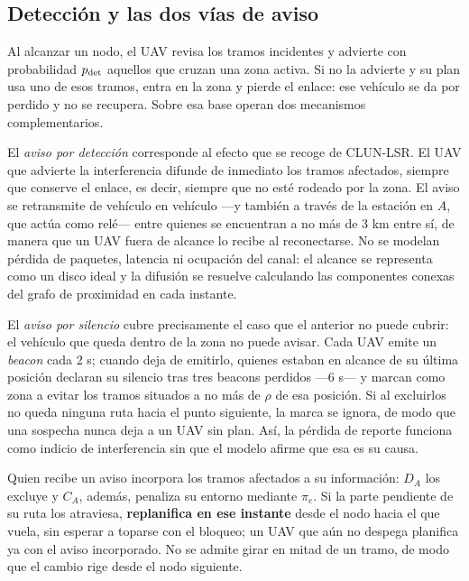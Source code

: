 \documentclass[journal,10pt]{IEEEtran}
\begin{document}
\subsection{Detección y las dos vías de aviso}

Al alcanzar un nodo, el UAV revisa los tramos incidentes y advierte con
probabilidad $p_{\rm det}$ aquellos que cruzan una zona activa. Si no la
advierte y su plan usa uno de esos tramos, entra en la zona y pierde el
enlace: ese vehículo se da por perdido y no se recupera. Sobre esa base
operan dos mecanismos complementarios.

El \emph{aviso por detección} corresponde al efecto que se recoge de
CLUN-LSR. El UAV que advierte la interferencia difunde de inmediato los
tramos afectados, siempre que conserve el enlace, es decir, siempre que no
esté rodeado por la zona. El aviso se retransmite de vehículo en vehículo
---y también a través de la estación en $A$, que actúa como relé--- entre
quienes se encuentran a no más de 3 km entre sí, de manera que un UAV fuera
de alcance lo recibe al reconectarse. No se modelan pérdida de paquetes,
latencia ni ocupación del canal: el alcance se representa como un disco
ideal y la difusión se resuelve calculando las componentes conexas del
grafo de proximidad en cada instante.

El \emph{aviso por silencio} cubre precisamente el caso que el anterior no
puede cubrir: el vehículo que queda dentro de la zona no puede avisar. Cada
UAV emite un \emph{beacon} cada 2 s; cuando deja de emitirlo, quienes
estaban en alcance de su última posición declaran su silencio tras tres
beacons perdidos ---6 s--- y marcan como zona a evitar los tramos situados
a no más de $\rho$ de esa posición. Si al excluirlos no queda ninguna ruta
hacia el punto siguiente, la marca se ignora, de modo que una sospecha
nunca deja a un UAV sin plan. Así, la pérdida de reporte funciona como
indicio de interferencia sin que el modelo afirme que esa es su causa.

Quien recibe un aviso incorpora los tramos afectados a su información:
$D_A$ los excluye y $C_A$, además, penaliza su entorno mediante $\pi_e$. Si
la parte pendiente de su ruta los atraviesa, \textbf{replanifica en ese
instante} desde el nodo hacia el que vuela, sin esperar a toparse con el
bloqueo; un UAV que aún no despega planifica ya con el aviso incorporado.
No se admite girar en mitad de un tramo, de modo que el cambio rige desde
el nodo siguiente.
\end{document}
